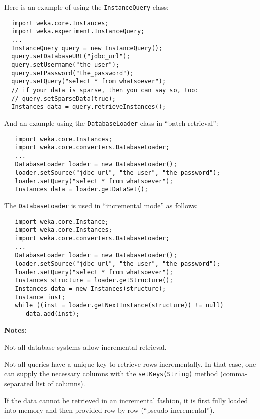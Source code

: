 \noindent Here is an example of using the \texttt{InstanceQuery} class:
\begin{verbatim}
  import weka.core.Instances;
  import weka.experiment.InstanceQuery;
  ...
  InstanceQuery query = new InstanceQuery();
  query.setDatabaseURL("jdbc_url");
  query.setUsername("the_user");
  query.setPassword("the_password");
  query.setQuery("select * from whatsoever");
  // if your data is sparse, then you can say so, too:
  // query.setSparseData(true);
  Instances data = query.retrieveInstances();
\end{verbatim}
And an example using the \texttt{DatabaseLoader} class in ``batch retrieval'':
\begin{verbatim}
   import weka.core.Instances;
   import weka.core.converters.DatabaseLoader;
   ...
   DatabaseLoader loader = new DatabaseLoader();
   loader.setSource("jdbc_url", "the_user", "the_password");
   loader.setQuery("select * from whatsoever");
   Instances data = loader.getDataSet();
\end{verbatim}

\samepage
\noindent The \texttt{DatabaseLoader} is used in ``incremental mode'' as
follows:
\begin{verbatim}
   import weka.core.Instance;
   import weka.core.Instances;
   import weka.core.converters.DatabaseLoader;
   ...
   DatabaseLoader loader = new DatabaseLoader();
   loader.setSource("jdbc_url", "the_user", "the_password");
   loader.setQuery("select * from whatsoever");
   Instances structure = loader.getStructure();
   Instances data = new Instances(structure);
   Instance inst;
   while ((inst = loader.getNextInstance(structure)) != null)
      data.add(inst);
\end{verbatim}

\noindent \textbf{Notes:}
\begin{tight_itemize}
	\item Not all database systems allow incremental retrieval.
	\item Not all queries have a unique key to retrieve rows incrementally. In
that case, one can supply the necessary columns with the
\texttt{setKeys(String)} method (comma-separated list of columns).
	\item If the data cannot be retrieved in an incremental fashion, it is first
fully loaded into memory and then provided row-by-row (``pseudo-incremental'').
\end{tight_itemize}

\newpage

